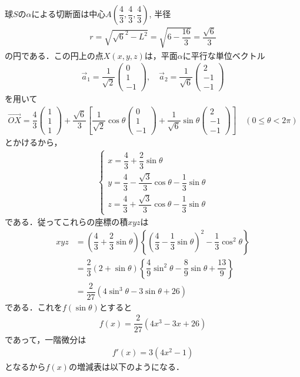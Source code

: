 \documentclass[../../main.tex]{subfiles}
\begin{document}
球$S$の$\alpha$による切断面は中心$A\left(\dfrac{4}{3},\dfrac{4}{3},\dfrac{4}{3}\right)$, 半径
\begin{align}
  r = \sqrt{\sqrt{6}^2 - L^2} = \sqrt{6-\dfrac{16}{3}} = \dfrac{\sqrt{6}}{3} \label{eq:1}
\end{align}
の円である．この円上の点$X(x,y,z)$は，平面$\alpha$に平行な単位ベクトル
\begin{align}
  \vec{a}_1 =
  \dfrac{1}{\sqrt{2}}
  \begin{pmatrix}0\\1\\-1
  \end{pmatrix}, \quad
  \vec{a}_2 =
  \dfrac{1}{\sqrt{6}}
  \begin{pmatrix}2\\-1\\-1
  \end{pmatrix} \label{eq:2}
\end{align}
を用いて
\begin{align}
  \overrightarrow{OX}=\dfrac{4}{3}
  \begin{pmatrix}1\\1\\1
  \end{pmatrix}+\dfrac{\sqrt{6}}{3}\left[\dfrac{1}{\sqrt{2}}\cos\theta
    \begin{pmatrix}0\\1\\-1
    \end{pmatrix}+\dfrac{1}{\sqrt{6}}\sin\theta
    \begin{pmatrix}2\\-1\\-1
  \end{pmatrix}\right]\quad(0\le\theta<2\pi)
\end{align}
とかけるから，
\begin{align}
  \begin{cases}
    x=\dfrac{4}{3}+\dfrac{2}{3}\sin\theta\\
    y=\dfrac{4}{3}-\dfrac{\sqrt{3}}{3}\cos\theta-\dfrac{1}{3}\sin\theta\\
    z=\dfrac{4}{3}+\dfrac{\sqrt{3}}{3}\cos\theta-\dfrac{1}{3}\sin\theta
  \end{cases} \label{eq:3}
\end{align}
である．従ってこれらの座標の積$xyz$は
\begin{align}
  xyz
  &=\left(\dfrac{4}{3}+\dfrac{2}{3}\sin\theta\right)
  \left\{\left(\dfrac{4}{3}-\dfrac{1}{3}\sin\theta\right)^2-\dfrac{1}{3}\cos^2\theta\right\}\\
  &=\dfrac{2}{3}(2+\sin\theta)\left\{\dfrac{4}{9}\sin^2\theta-\dfrac{8}{9}\sin\theta+\dfrac{13}{9}\right\}\\
  &=\dfrac{2}{27}(4\sin^3\theta-3\sin\theta+26)
\end{align}
である．これを$f(\sin\theta)$とすると
\begin{align}
  f(x) = \dfrac{2}{27}(4x^3-3x+26)
\end{align}
であって，一階微分は
\begin{align}
  f'(x)=3(4x^2-1)
\end{align}
となるから$f(x)$の増減表は以下のようになる．
\end{document}
